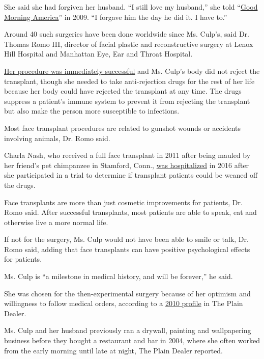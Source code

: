 She said she had forgiven her husband. ``I still love my husband,'' she
told
``\href{https://abcnews.go.com/Health/MindMoodNews/story?id=7535591}{Good
Morning America}'' in 2009. ``I forgave him the day he did it. I have
to.''

Around 40 such surgeries have been done worldwide since Ms. Culp's, said
Dr. Thomas Romo III, director of facial plastic and reconstructive
surgery at Lenox Hill Hospital and Manhattan Eye, Ear and Throat
Hospital.

\href{https://www.nytimes.com/2008/12/18/health/s18face.html}{Her
procedure was immediately successful} and Ms. Culp's body did not reject
the transplant, though she needed to take anti-rejection drugs for the
rest of her life because her body could have rejected the transplant at
any time. The drugs suppress a patient's immune system to prevent it
from rejecting the transplant but also make the person more susceptible
to infections.

Most face transplant procedures are related to gunshot wounds or
accidents involving animals, Dr. Romo said.

Charla Nash, who received a full face transplant in 2011 after being
mauled by her friend's pet chimpanzee in Stamford, Conn.,
\href{https://www.nytimes.com/2016/05/06/nyregion/chimpanzee-attack-victim-who-got-face-transplant-is-hospitalized.html}{was
hospitalized} in 2016 after she participated in a trial to determine if
transplant patients could be weaned off the drugs.

Face transplants are more than just cosmetic improvements for patients,
Dr. Romo said. After successful transplants, most patients are able to
speak, eat and otherwise live a more normal life.

If not for the surgery, Ms. Culp would not have been able to smile or
talk, Dr. Romo said, adding that face transplants can have positive
psychological effects for patients.

Ms. Culp is ``a milestone in medical history, and will be forever,'' he
said.

She was chosen for the then-experimental surgery because of her optimism
and willingness to follow medical orders, according to a
\href{https://www.cleveland.com/healthfit/2010/11/woman_who_underwent_first_near.html}{2010
profile} in The Plain Dealer.

Ms. Culp and her husband previously ran a drywall, painting and
wallpapering business before they bought a restaurant and bar in 2004,
where she often worked from the early morning until late at night, The
Plain Dealer reported.

